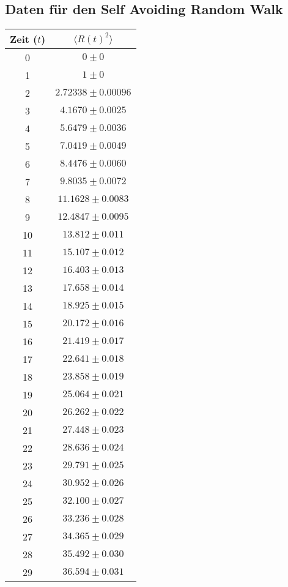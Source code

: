 \documentclass[prb,12pt]{revtex4-2}
\theoremstyle{definition}
\theoremstyle{definition}
\begin{document}
\subsection{Daten für den Self Avoiding Random Walk}
\begin{longtable}{cc}
	\toprule
	Zeit ($t$) & $\langle R(t)^2 \rangle $\\\midrule
	 0 & $0\pm 0 $ \\\midrule
	1 & $1\pm 0 $ \\\midrule
	2 & $2.72338\pm 0.00096 $ \\\midrule
	3 & $4.1670\pm 0.0025 $ \\\midrule
	4 & $5.6479\pm 0.0036 $ \\\midrule
	5 & $7.0419\pm 0.0049 $ \\\midrule
	6 & $8.4476\pm 0.0060 $ \\\midrule
	7 & $9.8035\pm 0.0072 $ \\\midrule
	8 & $11.1628\pm 0.0083 $ \\\midrule
	9 & $12.4847\pm 0.0095 $ \\\midrule
	10 & $13.812\pm 0.011 $ \\\midrule
	11 & $15.107\pm 0.012 $ \\\midrule
	12 & $16.403\pm 0.013 $ \\\midrule
	13 & $17.658\pm 0.014 $ \\\midrule
	14 & $18.925\pm 0.015 $ \\\midrule
	15 & $20.172\pm 0.016 $ \\\midrule
	16 & $21.419\pm 0.017 $ \\\midrule
	17 & $22.641\pm 0.018 $ \\\midrule
	18 & $23.858\pm 0.019 $ \\\midrule
	19 & $25.064\pm 0.021 $ \\\midrule
	20 & $26.262\pm 0.022 $ \\\midrule
	21 & $27.448\pm 0.023 $ \\\midrule
	22 & $28.636\pm 0.024 $ \\\midrule
	23 & $29.791\pm 0.025 $ \\\midrule
	24 & $30.952\pm 0.026 $ \\\midrule
	25 & $32.100\pm 0.027 $ \\\midrule
	26 & $33.236\pm 0.028 $ \\\midrule
	27 & $34.365\pm 0.029 $ \\\midrule
	28 & $35.492\pm 0.030 $ \\\midrule
	29 & $36.594\pm 0.031 $ \\\midrule

\end{longtable}
\end{document}
